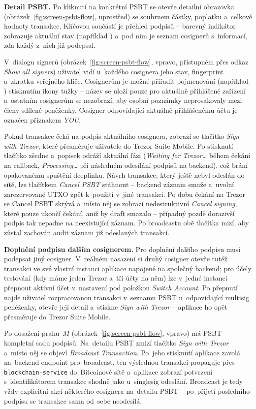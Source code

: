 \textbf{Detail PSBT.}
Po kliknutí na konkrétní PSBT se otevře detailní obrazovka
(obrázek~\ref{fig:screen-psbt-flow}, uprostřed) se souhrnem částky,
poplatku a~celkové hodnoty transakce. Klíčovou součástí je přehled
podpisů -- barevný indikátor zobrazuje aktuální stav (například
) a~pod ním je seznam cosignerů s~informací, zda
každý z~nich již podepsal.

V~dialogu signerů (obrázek~\ref{fig:screen-psbt-flow}, vpravo, přístupném
přes odkaz \emph{Show all signers}) uživatel vidí u~každého cosignera jeho
stav, fingerprint a~zkratku veřejného klíče. Cosignerům je možné přiřadit
pojmenování (například ) stisknutím ikony tužky -- název se uloží
pouze pro aktuálně přihlášené zařízení a~ostatním cosignerům se nezobrazí,
aby osobní poznámky neprosakovaly mezi členy sdílené peněženky. Cosigner
odpovídající aktuálně přihlášenému účtu je označen příznakem \emph{YOU}.

Pokud transakce čeká na podpis aktuálního cosignera, zobrazí se tlačítko
\emph{Sign with Trezor}, které přesměruje uživatele do Trezor Suite Mobile.
Po stisknutí tlačítko zšedne a~popisek odráží aktuální fázi
(\emph{Waiting for Trezor\ldots} během čekání na callback,
\emph{Processing\ldots} při následném odesílání podpisů na backend),
což brání opakovanému spuštění deeplinku.
Návrh transakce, který ještě nebyl odeslán do sítě, lze tlačítkem
\emph{Cancel PSBT} stáhnout -- backend záznam smaže a~uvolní zarezervované
UTXO zpět k~použití v~jiné transakci. Po dobu čekání na Trezor se Cancel PSBT
skrývá a~místo něj se zobrazí nedestruktivní \emph{Cancel signing}, které
pouze ukončí čekání, aniž by draft smazalo -- případný pozdě dorazivší
podpis tak nepadne na neexistující záznam. Po broadcastu obě tlačítka mizí,
aby zůstal zachován audit záznam již odeslaných transakcí.

\textbf{Doplnění podpisu dalším cosignerem.}
Pro doplnění dalšího podpisu musí podepsat jiný cosigner. V~reálném nasazení
si druhý cosigner otevře tutéž transakci ve své vlastní instanci aplikace
napojené na společný backend; pro účely testování (kdy máme jeden Trezor
a~tři účty na něm) lze v~jedné instanci přepnout aktivní účet v~nastavení
pod položkou \emph{Switch Account}. Po přepnutí najde uživatel
rozpracovanou transakci v~seznamu PSBT u~odpovídající multisig peněženky,
otevře její detail a~stiskne \emph{Sign with Trezor} -- aplikace ho opět
přesměruje do Trezor Suite Mobile.

Po dosažení prahu~$M$ (obrázek~\ref{fig:screen-psbt-flow}, vpravo)
má PSBT kompletní sadu podpisů. Na~detailu PSBT zmizí tlačítko
\emph{Sign with Trezor} a~místo něj se objeví \emph{Broadcast
Transaction}. Po~jeho stisknutí aplikace zavolá na~backend endpoint
pro~broadcast, ten výslednou transakci propaguje přes
\texttt{blockchain-service} do~Bitcoinové sítě a~aplikace zobrazí
potvrzení s~identifikátorem transakce shodně jako u~singlesig
odeslání. Broadcast je tedy vždy explicitní akcí některého
cosignera na~detailu PSBT -- po~přijetí posledního podpisu se
transakce sama od~sebe neodesílá.

